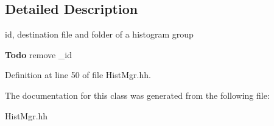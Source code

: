 \subsection{Detailed Description}
id, destination file and folder of a histogram group \begin{Desc}
\item[{\bf Todo}]remove \_\-id \end{Desc}


Definition at line 50 of file HistMgr.hh.

The documentation for this class was generated from the following file:\begin{DoxyCompactItemize}
\item 
HistMgr.hh\end{DoxyCompactItemize}
